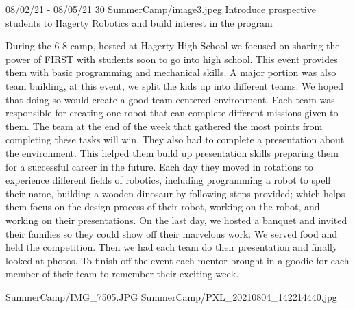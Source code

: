 {08/02/21 - 08/05/21}
{30}
{SummerCamp/image3.jpeg}
{Introduce prospective students to Hagerty Robotics and build interest in the program} 
{
During the 6-8 camp, hosted at Hagerty High School we focused on sharing the power of FIRST with students soon to go into high school. This event provides them with basic programming and mechanical skills. A major portion was also team building, at this event, we split the kids up into different teams. We hoped that doing so would create a good team-centered environment. Each team was responsible for creating one robot that can complete different missions given to them. The team at the end of the week that gathered the most points from completing these tasks will win. They also had to complete a presentation about the environment. This helped them build up presentation skills preparing them for a successful career in the future. Each day they moved in rotations to experience different fields of robotics, including programming a robot to spell their name, building a wooden dinosaur by following steps provided; which helps them focus on the design process of their robot, working on the robot, and working on their presentations. On the last day, we hosted a banquet and invited their families so they could show off their marvelous work. We served food and held the competition. Then we had each team do their presentation and finally looked at photos. To finish off the event each mentor brought in a goodie for each member of their team to remember their exciting week.

} 
{SummerCamp/IMG_7505.JPG}
{SummerCamp/PXL_20210804_142214440.jpg}
